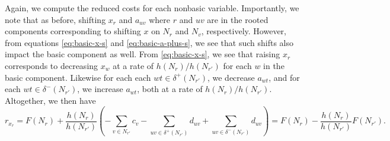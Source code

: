 \documentclass[titlepage,11pt]{article}
\begin{document}

Again, we compute the reduced costs for each nonbasic variable. Importantly, we note that as before, shifting $x_r$ and $a_{uv}$ where $r$ and $uv$ are in the rooted components corresponding to shifting $x$ on $N_r$ and $N_v$, respectively. However, from equations \eqref{eq:basic-x-s} and \eqref{eq:basic-a-plus-s}, we see that such shifts also impact the basic component as well. 
From \eqref{eq:basic-x-s}, we see that raising $x_r$ corresponds to decreasing $x_w$ at a rate of $h(N_r)/h(N_{r'})$ for each $w$ in the basic component. Likewise for each each $wt \in \delta^+(N_{r'})$, we decrease $a_{wt}$, and for each $wt \in \delta^-(N_{r'})$, we increase $a_{wt}$, both at a rate of $h(N_{r})/h(N_{r'})$. Altogether, we then have
\begin{equation}\label{eq:reduced-cost-vert-s}
    r_{x_r} = F(N_r) + \frac{h(N_r)}{h(N_{r'})} \left(-\sum_{v \in N_{r'}}c_v - \sum_{uv \in \delta^+(N_{r'})}d_{uv} + \sum_{uv \in \delta^-(N_{r'})}d_{uv}\right) = F(N_r) - \frac{h(N_r)}{h(N_{r'})}F(N_{r'}).
\end{equation}

\end{document}

